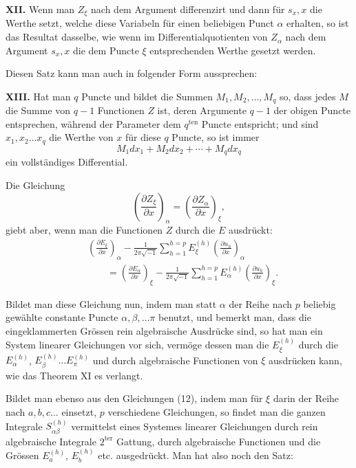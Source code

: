 \documentclass[10pt]{article}
\begin{document}
\noindent\textbf{XII.} Wenn man \(Z_\xi\) nach dem Argument differenzirt und dann für \(s_x,x\) die Werthe setzt, welche diese Variabeln für einen beliebigen Punct \(\alpha\) erhalten, so ist das Resultat dasselbe, wie wenn im Differentialquotienten von \(Z_\alpha\) nach dem Argument \(s_x,x\) die dem Puncte \(\xi\) entsprechenden Werthe gesetzt werden.

Diesen Satz kann man auch in folgender Form aussprechen:

\noindent\textbf{XIII.} Hat man \(q\) Puncte und bildet die Summen \(M_1,M_2,\ldots,M_q\) so, dass jedes \(M\) die Summe von \(q-1\) Functionen \(Z\) ist, deren Argumente \(q-1\) der obigen Puncte entsprechen, während der Parameter dem \(q^{\mathrm{ten}}\) Puncte entspricht; und sind \(x_1,x_2\ldots x_q\) die Werthe von \(x\) für diese \(q\) Puncte, so ist immer
\[
M_1dx_1+M_2dx_2+\cdots+M_qdx_q
\]
ein vollständiges Differential.

Die Gleichung
\[
\tag{17}
\left(\frac{\partial Z_\xi}{\partial x}\right)_\alpha=
\left(\frac{\partial Z_\alpha}{\partial x}\right)_\xi,
\]
giebt aber, wenn man die Functionen \(Z\) durch die \(E\) ausdrückt:
\[
\tag{18}
\begin{aligned}
&\left(\frac{\partial E_\xi}{\partial x}\right)_\alpha
-\frac{1}{2\pi\sqrt{-1}}\sum_{h=1}^{h=p}E_\xi^{(h)}\left(\frac{\partial u_h}{\partial x}\right)_\alpha\\
&\qquad=\left(\frac{\partial E_\alpha}{\partial x}\right)_\xi
-\frac{1}{2\pi\sqrt{-1}}\sum_{h=1}^{h=p}E_\alpha^{(h)}\left(\frac{\partial u_h}{\partial x}\right)_\xi.
\end{aligned}
\]

Bildet man diese Gleichung nun, indem man statt \(\alpha\) der Reihe nach \(p\) beliebig gewählte constante Puncte \(\alpha,\beta,\ldots\pi\) benutzt, und bemerkt man, dass die eingeklammerten Grössen rein algebraische Ausdrücke sind, so hat man ein System linearer Gleichungen vor sich, vermöge dessen man die \(E_\xi^{(h)}\) durch die \(E_\alpha^{(h)}\), \(E_\beta^{(h)}\ldots E_\pi^{(h)}\) und durch algebraische Functionen von \(\xi\) ausdrücken kann, wie das Theorem XI es verlangt.

Bildet man ebenso aus den Gleichungen (12), indem man für \(\xi\) darin der Reihe nach \(a,b,c\ldots\) einsetzt, \(p\) verschiedene Gleichungen, so findet man die ganzen Integrale \(S_{\alpha\beta}^{(h)}\) vermittelst eines Systemes linearer Gleichungen durch rein algebraische Integrale \(2^{\mathrm{ter}}\) Gattung, durch algebraische Functionen und die Grössen \(E_a^{(h)}\), \(E_b^{(h)}\) etc. ausgedrückt. Man hat also noch den Satz:
\end{document}
